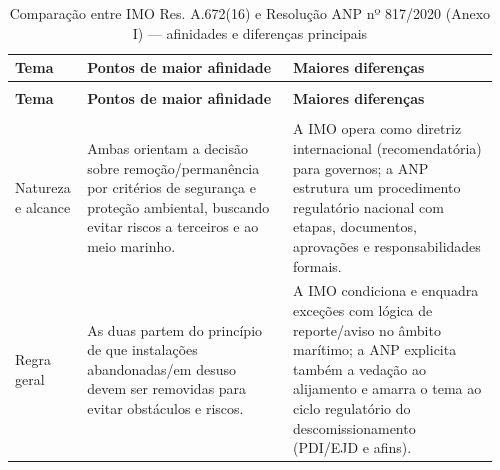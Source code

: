 %   
%

\begin{landscape}

\setlength{\LTpre}{6pt}
\setlength{\LTpost}{6pt}

\renewcommand{\arraystretch}{1.15}

\footnotesize
\begin{longtable}{@{}
  >{\RaggedRight\arraybackslash}p{0.14\linewidth}
  >{\RaggedRight\arraybackslash}p{0.41\linewidth}
  >{\RaggedRight\arraybackslash}p{0.41\linewidth}
@{}}

\caption{Comparação entre IMO Res. A.672(16) e Resolução ANP nº 817/2020 (Anexo I) — afinidades e diferenças principais}
\label{tab:comparativo_imo_anp}\\

\toprule
\textbf{Tema} & \textbf{Pontos de maior afinidade} & \textbf{Maiores diferenças} \\
\midrule
\endfirsthead

\multicolumn{3}{@{}l@{}}{\textit{(continuação)} — Tabela \ref{tab:comparativo_imo_anp}}\\
\toprule
\textbf{Tema} & \textbf{Pontos de maior afinidade} & \textbf{Maiores diferenças} \\
\midrule
\endhead

\midrule
\multicolumn{3}{r@{}}{\textit{continua na próxima página}}\\
\endfoot

\bottomrule
\endlastfoot

Natureza e alcance &
Ambas orientam a decisão sobre remoção/permanência por critérios de segurança e proteção ambiental, buscando evitar riscos a terceiros e ao meio marinho. &
A IMO opera como diretriz internacional (recomendatória) para governos; a ANP estrutura um procedimento regulatório nacional com etapas, documentos, aprovações e responsabilidades formais. \\

Regra geral &
As duas partem do princípio de que instalações abandonadas/em desuso devem ser removidas para evitar obstáculos e riscos. &
A IMO condiciona e enquadra exceções com lógica de reporte/aviso no âmbito marítimo; a ANP explicita também a vedação ao alijamento e amarra o tema ao ciclo regulatório do descomissionamento (PDI/EJD e afins). \\


\end{longtable}
\end{landscape}
